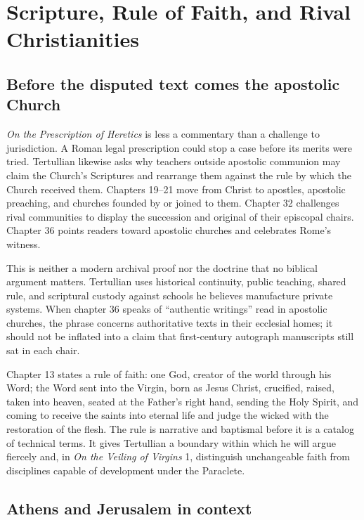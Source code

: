 \section{Scripture, Rule of Faith, and Rival Christianities}

\subsection{Before the disputed text comes the apostolic Church}

\emph{On the Prescription of Heretics} is less a commentary than a challenge
to jurisdiction. A Roman legal prescription could stop a case before its
merits were tried. Tertullian likewise asks why teachers outside apostolic
communion may claim the Church's Scriptures and rearrange them against the rule
by which the Church received them. Chapters 19--21 move from Christ to apostles,
apostolic preaching, and churches founded by or joined to them. Chapter 32
challenges rival communities to display the succession and original of their
episcopal chairs. Chapter 36 points readers toward apostolic churches and
celebrates Rome's witness.

This is neither a modern archival proof nor the doctrine that no biblical
argument matters. Tertullian uses historical continuity, public teaching,
shared rule, and scriptural custody against schools he believes manufacture
private systems. When chapter 36 speaks of ``authentic writings'' read in
apostolic churches, the phrase concerns authoritative texts in their ecclesial
homes; it should not be inflated into a claim that first-century autograph
manuscripts still sat in each chair.

Chapter 13 states a rule of faith: one God, creator of the world through his
Word; the Word sent into the Virgin, born as Jesus Christ, crucified, raised,
taken into heaven, seated at the Father's right hand, sending the Holy Spirit,
and coming to receive the saints into eternal life and judge the wicked with
the restoration of the flesh. The rule is narrative and baptismal before it is
a catalog of technical terms. It gives Tertullian a boundary within which he
will argue fiercely and, in \emph{On the Veiling of Virgins} 1, distinguish
unchangeable faith from disciplines capable of development under the
Paraclete.

\subsection{Athens and Jerusalem in context}

